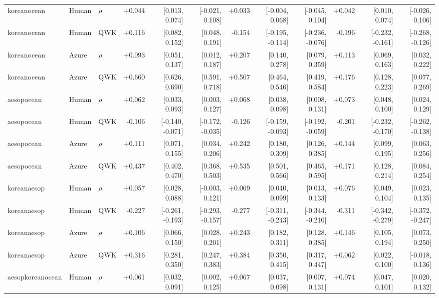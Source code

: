 \begin{landscape}
\begin{longtable}{@{}lllrrrrrrrrr@{}}
\addlinespace[2pt]
koreanocean & Human & $\rho$ & +0.044 & [0.013, 0.074] & [-0.021, 0.108] & +0.033 & [-0.004, 0.068] & [-0.045, 0.104] & +0.042 & [0.010, 0.074] & [-0.026, 0.106]\\
koreanocean & Human & QWK & +0.116 & [0.082, 0.152] & [0.048, 0.191] & -0.154 & [-0.195, -0.114] & [-0.236, -0.076] & -0.196 & [-0.232, -0.161] & [-0.268, -0.126]\\
koreanocean & Azure & $\rho$ & +0.093 & [0.051, 0.137] & [0.012, 0.187] & +0.207 & [0.140, 0.278] & [0.079, 0.359] & +0.113 & [0.069, 0.163] & [0.032, 0.222]\\
koreanocean & Azure & QWK & +0.660 & [0.626, 0.690] & [0.591, 0.718] & +0.507 & [0.464, 0.546] & [0.419, 0.584] & +0.176 & [0.128, 0.223] & [0.077, 0.269]\\
\addlinespace[2pt]
aesopocean & Human & $\rho$ & +0.062 & [0.033, 0.093] & [0.003, 0.127] & +0.068 & [0.038, 0.098] & [0.008, 0.131] & +0.073 & [0.048, 0.100] & [0.024, 0.129]\\
aesopocean & Human & QWK & -0.106 & [-0.140, -0.071] & [-0.172, -0.035] & -0.126 & [-0.159, -0.093] & [-0.192, -0.059] & -0.201 & [-0.232, -0.170] & [-0.262, -0.138]\\
aesopocean & Azure & $\rho$ & +0.111 & [0.071, 0.155] & [0.034, 0.206] & +0.242 & [0.180, 0.309] & [0.126, 0.385] & +0.144 & [0.099, 0.195] & [0.063, 0.256]\\
aesopocean & Azure & QWK & +0.437 & [0.402, 0.470] & [0.368, 0.503] & +0.535 & [0.501, 0.566] & [0.465, 0.595] & +0.171 & [0.128, 0.214] & [0.084, 0.254]\\
\addlinespace[2pt]
koreanaesop & Human & $\rho$ & +0.057 & [0.028, 0.088] & [-0.003, 0.121] & +0.069 & [0.040, 0.099] & [0.013, 0.133] & +0.076 & [0.049, 0.104] & [0.023, 0.135]\\
koreanaesop & Human & QWK & -0.227 & [-0.261, -0.193] & [-0.293, -0.157] & -0.277 & [-0.311, -0.243] & [-0.344, -0.210] & -0.311 & [-0.342, -0.279] & [-0.372, -0.247]\\
koreanaesop & Azure & $\rho$ & +0.106 & [0.066, 0.150] & [0.028, 0.201] & +0.243 & [0.182, 0.311] & [0.128, 0.385] & +0.146 & [0.105, 0.194] & [0.073, 0.250]\\
koreanaesop & Azure & QWK & +0.316 & [0.281, 0.350] & [0.247, 0.383] & +0.384 & [0.350, 0.415] & [0.317, 0.447] & +0.062 & [0.022, 0.100] & [-0.018, 0.136]\\
\addlinespace[2pt]
aesopkoreanocean & Human & $\rho$ & +0.061 & [0.032, 0.091] & [0.002, 0.125] & +0.067 & [0.037, 0.098] & [0.007, 0.131] & +0.074 & [0.047, 0.101] & [0.020, 0.132]\\

\end{longtable}
\end{landscape}
